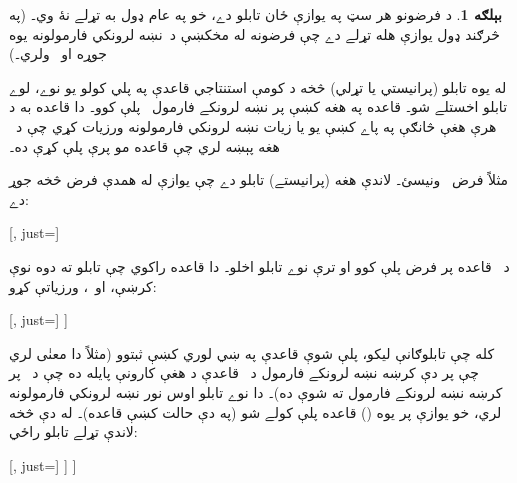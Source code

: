 \documentclass[12pt,a4paper,oneside]{report}
\theoremstyle{definition}
\newtheorem{ex}[thm]{بېلګه}
\begin{document}
\label{olpseg:OLP-0102-B008:start}
\begin{ex}
  د فرضونو هر سټ په يوازې ځان تابلو دے، خو په عام ډول به
  تړلے نۀ وي۔ (په څرګند ډول يوازې هله تړلے دے چې فرضونه له مخکښې
  د~نښه لرونکي فارمولونه يوه جوړه
   او~ ولري۔)
\label{olpseg:OLP-0102-B008:end}

\label{olpseg:OLP-0102-B009:start}
له يوه تابلو (پرانيستي يا تړلي) څخه د کومې استنتاجي قاعدې
  په پلي کولو يو نوے، لوے تابلو اخستلے شو۔ قاعده په هغه کښې پر
  نښه لرونکے فارمول~ پلې کوو۔ دا قاعده به د هرې هغې څانګې په
  پاے کښې يو يا زيات نښه لرونکي فارمولونه ورزيات کړي چې د~ هغه
  پېښه لري چې قاعده مو پرې پلې کړې ده۔
\label{olpseg:OLP-0102-B009:end}

\label{olpseg:OLP-0102-B010:start}
مثلاً فرض~ ونيسئ۔ لاندې هغه
  (پرانيستے) تابلو دے چې يوازې له همدې فرض څخه جوړ دے:
  \begin{center}
    \begin{tableau}{}
      [, just=\TAss]
    \end{tableau}{}
  \end{center}
  د~\LR{$\TRule{\True}{\land}$} قاعده پر فرض پلې کوو او ترې نوے
  تابلو اخلو۔ دا قاعده راکوي چې تابلو ته دوه نوې کرښې،
   او~، ورزياتې کړو:
  \begin{center}
    \begin{tableau}{}
      [, just=\TAss
        [\sFmla{\True}{\formula{A}}, just={\TRule{\True}{\land}[1]},
          [\sFmla{\True}{\lnot \formula{A}}, just={\TRule{\True}{\land}[1]}
          ]
        ]
      ]
    \end{tableau}{}
  \end{center}
  کله چې تابلوګانې ليکو، پلې شوې قاعدې په ښي لوري کښې ثبتوو
  (مثلاً  دا معنٰی لري چې پر دې کرښه
  نښه لرونکے فارمول د~\LR{$\TRule{\True}{\land}$} قاعدې د هغې کارونې
  پايله ده چې د~ پر کرښه نښه لرونکے فارمول ته شوې ده)۔ دا نوے
  تابلو اوس نور نښه لرونکي فارمولونه لري، خو يوازې پر يوه
  () قاعده پلې کولے شو (په دې حالت کښې
  \LR{$\TRule{\True}{\lnot}$} قاعده)۔ له دې څخه لاندې تړلے
  تابلو راځي:
  \begin{center}
    \begin{tableau}{}
      [, just=\TAss
        [\sFmla{\True}{\formula{A}}, just={\TRule{\True}{\land}[1]}
          [\sFmla{\True}{\lnot \formula{A}}, just={\TRule{\True}{\land}[1]}
            [\sFmla{\False}{\formula{A}}, just={\TRule{\True}{\lnot}[3]}, close]
          ]
        ]
      ]
    \end{tableau}{}
  \end{center}
\end{ex}
\label{olpseg:OLP-0102-B010:end}
\end{document}
